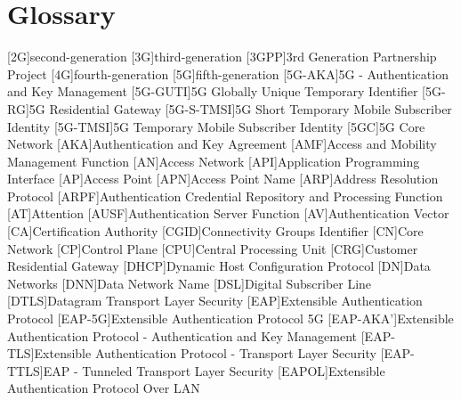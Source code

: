 \chapter{Glossary}

\footnotesize
\SingleSpacing

\begin{multicols}{2}
    \begin{acronym}[WPA]
        [2G]{second-generation}
        [3G]{third-generation}
        [3GPP]{3rd Generation Partnership Project}
        [4G]{fourth-generation}
        [5G]{fifth-generation}
        [5G-AKA]{5G - Authentication and Key Management}
        [5G-GUTI]{5G Globally Unique Temporary Identifier}
        [5G-RG]{5G Residential Gateway}
        [5G-S-TMSI]{5G Short Temporary Mobile Subscriber Identity}
        [5G-TMSI]{5G Temporary Mobile Subscriber Identity}
        [5GC]{5G Core Network}
        [AKA]{Authentication and Key Agreement}
        [AMF]{Access and Mobility Management Function}
        [AN]{Access Network}
        [API]{Application Programming Interface}
        [AP]{Access Point}
        [APN]{Access Point Name}
        [ARP]{Address Resolution Protocol}
        [ARPF]{Authentication Credential Repository and Processing Function}
        [AT]{Attention}
        [AUSF]{Authentication Server Function}
        [AV]{Authentication Vector}
        [CA]{Certification Authority}
        [CGID]{Connectivity Groups Identifier}
        [CN]{Core Network}
        [CP]{Control Plane}
        [CPU]{Central Processing Unit}
        [CRG]{Customer Residential Gateway}
        [DHCP]{Dynamic Host Configuration Protocol}
        [DN]{Data Networks}
        [DNN]{Data Network Name}
        [DSL]{Digital Subscriber Line}
        [DTLS]{Datagram Transport Layer Security}
        [EAP]{Extensible Authentication Protocol}
        [EAP-5G]{Extensible Authentication Protocol 5G}
        [EAP-AKA']{Extensible Authentication Protocol - Authentication and Key Management}
        [EAP-TLS]{Extensible Authentication Protocol - Transport Layer Security}
        [EAP-TTLS]{EAP - Tunneled Transport Layer Security}
        [EAPOL]{Extensible Authentication Protocol Over LAN}

\end{acronym}
\end{multicols}

